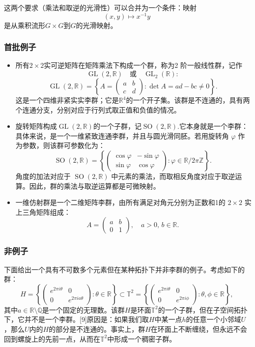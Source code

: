 这两个要求（乘法和取逆的光滑性）可以合并为一个条件：映射
$$
(x,y) \mapsto x^{-1}y~
$$
是从乘积流形$G \times G$到$G$的光滑映射。
\subsubsection{首批例子}
\begin{itemize}
\item 所有$2 \times 2$实可逆矩阵在矩阵乘法下构成一个群，称为2 阶一般线性群，记作
$$
\operatorname{GL}(2,\mathbb{R}) \quad \text{或} \quad \operatorname{GL}_{2}(\mathbb{R}) :~
$$
$$
\operatorname{GL}(2,\mathbb{R})=\left\{A=\begin{pmatrix}a & b \\ c & d\end{pmatrix} : \det A = ad - bc \neq 0 \right\}.~
$$
这是一个四维非紧实实李群；它是$\mathbb{R}^4$的一个开子集。该群是不连通的，具有两个连通分支，分别对应于行列式取正值和负值的情况。
\item 旋转矩阵构成$\operatorname{GL}(2,\mathbb{R})$的一个子群，记$\operatorname{SO}(2,\mathbb{R})$.它本身就是一个李群：具体来说，是一个一维紧致连通李群，并且与圆光滑同胚。若用旋转角 $\varphi$ 作为参数，则该群可参数化为：
$$
\operatorname{SO}(2,\mathbb{R})=\left\{\begin{pmatrix}\cos \varphi & -\sin \varphi \\ \sin \varphi & \cos \varphi \end{pmatrix} : \varphi \in \mathbb{R} / 2\pi\mathbb{Z}\right\}.~
$$
角度的加法对应于 $\operatorname{SO}(2,\mathbb{R})$ 中元素的乘法，而取相反角度对应于取逆运算。因此，群的乘法与取逆运算都是可微映射。
\item 一维仿射群是一个二维矩阵李群，由所有满足对角元分别为正数和1的 $2 \times 2$ 实上三角矩阵组成：
$$
A=\begin{pmatrix} a & b \\ 0 & 1 \end{pmatrix}, \quad a > 0, \, b \in \mathbb{R}.~
$$
\end{itemize}
\subsubsection{非例子}
下面给出一个具有不可数多个元素但在某种拓扑下并非李群的例子。考虑如下的群：
$$
H = \left\{\begin{pmatrix} e^{2\pi i \theta} & 0 \\ 0 & e^{2\pi i a \theta} \end{pmatrix} : \theta \in \mathbb{R} \right\} 
\subset 
\mathbb{T}^2 = \left\{\begin{pmatrix} e^{2\pi i \theta} & 0 \\ 0 & e^{2\pi i \phi} \end{pmatrix} : \theta, \phi \in \mathbb{R} \right\},~
$$
其中$a \in \mathbb{R} \setminus \mathbb{Q}$是一个固定的无理数。该群$H$是环面$\mathbb{T}^2$的一个子群，但在子空间拓扑下，它并不是一个李群。[9]原因是：如果我们取$H$中某一点$h$的任意一个小邻域$U$，那么$U$内的$H$的部分是不连通的。事实上，群$H$在环面上不断缠绕，但永远不会回到螺旋上的先前一点，从而在$\mathbb{T}^2$中形成一个稠密子群。


